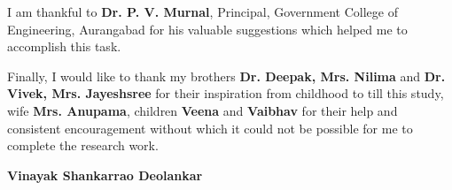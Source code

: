 I am thankful to \textbf{Dr. P. V. Murnal}, Principal, Government College of Engineering, Aurangabad for his valuable suggestions which helped me to accomplish this task. 

Finally, I would like to thank my brothers \textbf{Dr. Deepak, Mrs. Nilima} and \textbf{Dr. Vivek, Mrs. Jayeshsree} for their inspiration from childhood to till this study, wife \textbf{Mrs. Anupama}, children \textbf{Veena} and \textbf{Vaibhav} for their help and consistent encouragement without which it could not be possible for me to complete the research work.


\setlength{\parskip}{0em}
\vspace{2cm}
\begin{flushright}
\textbf{Vinayak Shankarrao Deolankar}
\end{flushright}